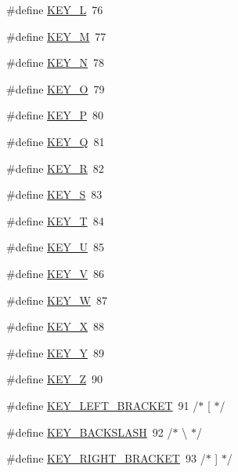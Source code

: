 \begin{DoxyCompactItemize}
\item 
\#define \hyperlink{group___keys_ga600bb1ce7eb7b6ca4dcbb41546c32ec5}{K\-E\-Y\-\_\-\-L}~76
\item 
\#define \hyperlink{group___keys_gae2552d156f2ef6dff240456f7c648beb}{K\-E\-Y\-\_\-\-M}~77
\item 
\#define \hyperlink{group___keys_ga2e446da6a7d4ff47e81f5318a40e53ea}{K\-E\-Y\-\_\-\-N}~78
\item 
\#define \hyperlink{group___keys_gadc0df72b7f6cbb006adeabff653ebeac}{K\-E\-Y\-\_\-\-O}~79
\item 
\#define \hyperlink{group___keys_ga0d7cb02ca48dc1dc020e54d104fb9915}{K\-E\-Y\-\_\-\-P}~80
\item 
\#define \hyperlink{group___keys_ga201284fc5d50eea7e2db09fb5495bceb}{K\-E\-Y\-\_\-\-Q}~81
\item 
\#define \hyperlink{group___keys_gaa020da9e48a194889ac72f94408b3c25}{K\-E\-Y\-\_\-\-R}~82
\item 
\#define \hyperlink{group___keys_ga6f09e2899747f5db41369ce1dae11ebd}{K\-E\-Y\-\_\-\-S}~83
\item 
\#define \hyperlink{group___keys_gadb39050b8845e8b16f503a747e196749}{K\-E\-Y\-\_\-\-T}~84
\item 
\#define \hyperlink{group___keys_ga050a6de4c5edb8eb9582c3eb80fed07f}{K\-E\-Y\-\_\-\-U}~85
\item 
\#define \hyperlink{group___keys_ga1b4a450ef7e51ae0b691dd5489f74535}{K\-E\-Y\-\_\-\-V}~86
\item 
\#define \hyperlink{group___keys_gafdebd5d771ee260c703a74f459767c09}{K\-E\-Y\-\_\-\-W}~87
\item 
\#define \hyperlink{group___keys_ga832280ef5a7afeda19f32939951e8b10}{K\-E\-Y\-\_\-\-X}~88
\item 
\#define \hyperlink{group___keys_gad9db04899df9fe71bb221c02721e28ac}{K\-E\-Y\-\_\-\-Y}~89
\item 
\#define \hyperlink{group___keys_ga7c655f9f55336c6db42503e356028f4d}{K\-E\-Y\-\_\-\-Z}~90
\item 
\#define \hyperlink{group___keys_ga4ac032967bfa2021b38e8127e50d97e1}{K\-E\-Y\-\_\-\-L\-E\-F\-T\-\_\-\-B\-R\-A\-C\-K\-E\-T}~91  /$\ast$ \mbox{[} $\ast$/
\item 
\#define \hyperlink{group___keys_ga8734bd813d4bbbab29cdf61a085b6762}{K\-E\-Y\-\_\-\-B\-A\-C\-K\-S\-L\-A\-S\-H}~92  /$\ast$ \textbackslash{} $\ast$/
\item 
\#define \hyperlink{group___keys_ga9c8d4a791d76ddab78fcb714dc0e703f}{K\-E\-Y\-\_\-\-R\-I\-G\-H\-T\-\_\-\-B\-R\-A\-C\-K\-E\-T}~93  /$\ast$ \mbox{]} $\ast$/

\end{DoxyCompactItemize}
